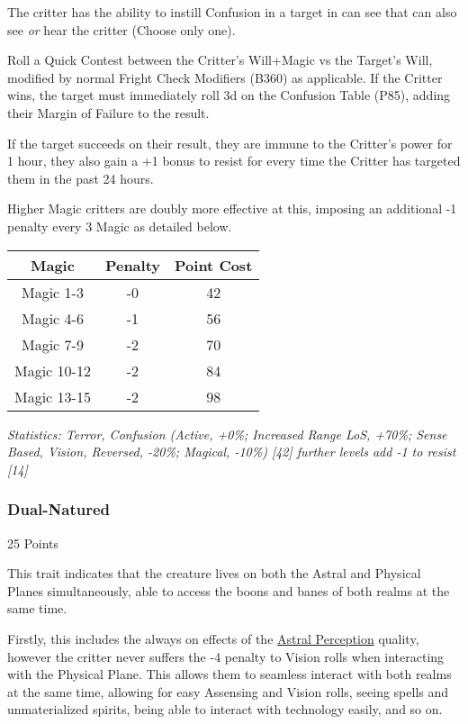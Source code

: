 \begin{multicols*}{3}
	The critter has the ability to instill Confusion in a target in can see that can also see \textit{or} hear the critter (Choose only one). 
	
	Roll a Quick Contest between the Critter's Will+Magic vs the Target's Will, modified by normal Fright Check Modifiers (B360) as applicable. If the Critter wins, the target must immediately roll 3d on the Confusion Table (P85), adding their Margin of Failure to the result.
	
	If the target succeeds on their result, they are immune to the Critter's power for 1 hour, they also gain a +1 bonus to resist for every time the Critter has targeted them in the past 24 hours.
	
	Higher Magic critters are doubly more effective at this, imposing an additional -1 penalty every 3 Magic as detailed below.
	
	\begin{center}
		\begin{tabular}{|c|c|c|}
			\hline
			Magic & Penalty & Point Cost\\
			\hline
			\hline
			Magic 1-3 & -0 & 42 \\
			Magic 4-6 & -1 & 56 \\
			Magic 7-9 & -2 & 70 \\
			Magic 10-12 & -2 & 84 \\
			Magic 13-15 & -2 & 98 \\
			\hline
		\end{tabular}
	\end{center}
	
	\textcolor{OliveGreen}{\textit{Statistics: Terror, Confusion (Active, +0\%; Increased Range LoS, +70\%; Sense Based, Vision, Reversed, -20\%; Magical, -10\%) [42] further levels add -1 to resist [14]
	}}

	\subsubsection{Dual-Natured}\label{dual_natured}
	\begin{flushright}
		25 Points
	\end{flushright}

	This trait indicates that the creature lives on both the Astral and Physical Planes simultaneously, able to access the boons and banes of both realms at the same time.
	
	Firstly, this includes the always on effects of the \hyperref[astral_perception]{Astral Perception} quality, however the critter never suffers the -4 penalty to Vision rolls when interacting with the Physical Plane. This allows them to seamless interact with both realms at the same time, allowing for easy Assensing and Vision rolls, seeing spells and unmaterialized spirits, being able to interact with technology easily, and so on.
	

\end{multicols*}
